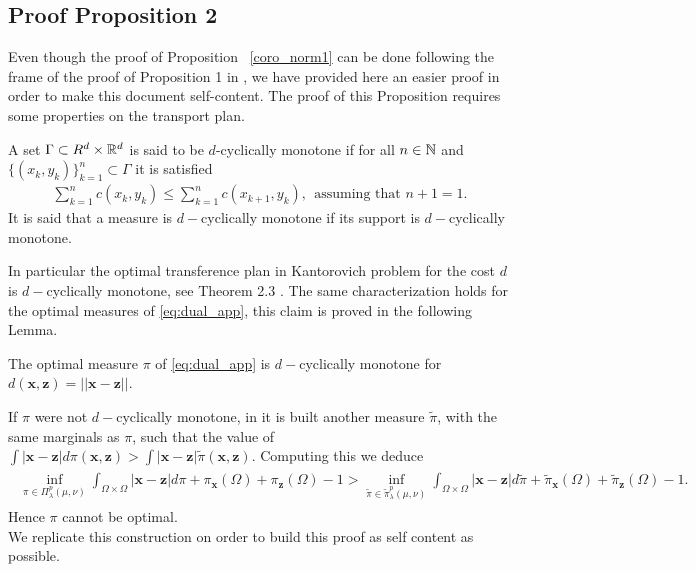 \subsection{Proof Proposition 2}
\indent 
Even though the proof of Proposition~ \ref{coro_norm1} can be done following the frame of the proof of  Proposition 1 in \cite{gulrajani2017improved}, we have provided here   an easier proof  in order to make this document  self-content.  The proof of this Proposition requires some properties on the transport plan.
\begin{Definition}\label{def:c_ci}
A set $\Gamma\subset R^d\times \mathbb{R}^d$ is said to be $d$-cyclically monotone if for all $n\in \mathbb{N}$ and $\{(x_k,y_k)\}_{k=1}^{n} \subset \Gamma $ it is satisfied 
\begin{align}
	\sum_{k=1}^n c(x_k,y_k)\leq \sum_{k=1}^n c(x_{k+1},y_k), \ \ \text{assuming that  $n+1=1$}. 
\end{align}
It is said that a measure is  $d-$cyclically monotone if its support is  $d-$cyclically monotone.
\end{Definition}
In particular the optimal transference plan in Kantorovich problem for the cost $d$ is $d-$cyclically monotone, see Theorem 2.3 \cite{GaMc}. The same characterization holds for the optimal measures of \eqref{eq:dual_app}, this claim is proved in the following Lemma.
\begin{Lemma}\label{lem:d_mono}
The optimal measure $\pi$ of \eqref{eq:dual_app} is $d-$cyclically monotone for $d(\textbf{x},\textbf{z})=||\textbf{x}-\textbf{z} ||$.
\end{Lemma}
If $\pi$ were not $d-$cyclically monotone, in \cite{villani2008} it is built another measure $\tilde{\pi}$, with the same marginals as $\pi$, such that the value of $\int |\textbf{x}-\textbf{z}|d\pi(\textbf{x},\textbf{z})>\int |\textbf{x}-\textbf{z}|\tilde{\pi}(\textbf{x},\textbf{z})$. Computing this we deduce
\begin{align*}
\begin{split}
	\inf_{\pi \in\Pi^p_{\lambda}(\mu, \nu)}\int_{\Omega\times \Omega}|{\textbf{x}}-{{\textbf{z}}} |d\pi + \pi_{\textbf{x}}(\Omega)+\pi_{{\textbf{z}}}(\Omega)-1> \inf_{\tilde{\pi} \in\tilde{\pi}^p_{\lambda}(\mu, \nu)}\int_{\Omega\times \Omega}|{\textbf{x}}-{{\textbf{z}}} |d\tilde{\pi} + \tilde{\pi}_{\textbf{x}}(\Omega)+\tilde{\pi}_{{\textbf{z}}}(\Omega)-1.
	\end{split}
\end{align*}
Hence $\pi$ cannot be optimal. \\
We replicate this construction on order to build this proof as self content as possible.\\ 
